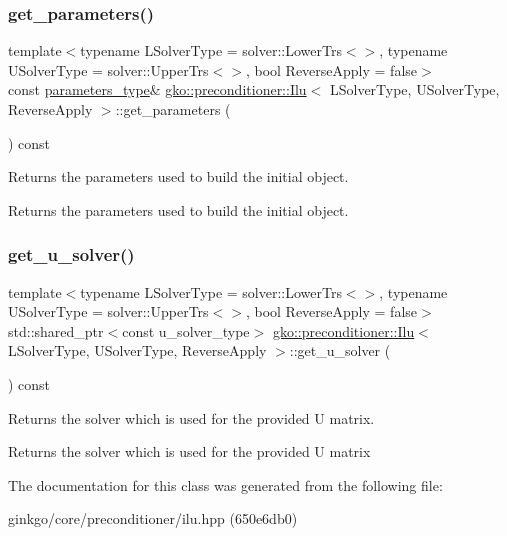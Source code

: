 \subsubsection{\texorpdfstring{get\+\_\+parameters()}{get\_parameters()}}
{\footnotesize\ttfamily template$<$typename L\+Solver\+Type  = solver\+::\+Lower\+Trs$<$$>$, typename U\+Solver\+Type  = solver\+::\+Upper\+Trs$<$$>$, bool Reverse\+Apply = false$>$ \\
const \hyperlink{structgko_1_1preconditioner_1_1Ilu_1_1parameters__type}{parameters\+\_\+type}\& \hyperlink{classgko_1_1preconditioner_1_1Ilu}{gko\+::preconditioner\+::\+Ilu}$<$ L\+Solver\+Type, U\+Solver\+Type, Reverse\+Apply $>$\+::get\+\_\+parameters (\begin{DoxyParamCaption}{ }\end{DoxyParamCaption}) const\hspace{0.3cm}{\ttfamily [inline]}}



Returns the parameters used to build the initial object. 

\begin{DoxyReturn}{Returns}
the parameters used to build the initial object. 
\end{DoxyReturn}
\mbox{\label{classgko_1_1preconditioner_1_1Ilu_a59f3fbe0e393f48c900a06479dab618a}} 
\subsubsection{\texorpdfstring{get\+\_\+u\+\_\+solver()}{get\_u\_solver()}}
{\footnotesize\ttfamily template$<$typename L\+Solver\+Type  = solver\+::\+Lower\+Trs$<$$>$, typename U\+Solver\+Type  = solver\+::\+Upper\+Trs$<$$>$, bool Reverse\+Apply = false$>$ \\
std\+::shared\+\_\+ptr$<$const u\+\_\+solver\+\_\+type$>$ \hyperlink{classgko_1_1preconditioner_1_1Ilu}{gko\+::preconditioner\+::\+Ilu}$<$ L\+Solver\+Type, U\+Solver\+Type, Reverse\+Apply $>$\+::get\+\_\+u\+\_\+solver (\begin{DoxyParamCaption}{ }\end{DoxyParamCaption}) const\hspace{0.3cm}{\ttfamily [inline]}}



Returns the solver which is used for the provided U matrix. 

\begin{DoxyReturn}{Returns}
the solver which is used for the provided U matrix 
\end{DoxyReturn}


The documentation for this class was generated from the following file\+:\begin{DoxyCompactItemize}
\item 
ginkgo/core/preconditioner/ilu.\+hpp (650e6db0)\end{DoxyCompactItemize}

